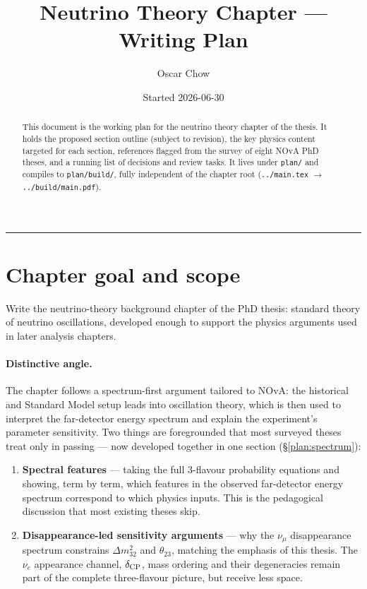 \documentclass[11pt]{article}
\title{Neutrino Theory Chapter — Writing Plan}
\author{Oscar Chow}
\date{Started 2026-06-30}
\begin{document}
\maketitle

\begin{abstract}
\noindent This document is the working plan for the neutrino theory chapter of the thesis. It
holds the proposed section outline (subject to revision), the key physics content targeted for
each section, references flagged from the survey of eight NOvA PhD theses, and a running list of
decisions and review tasks. It lives under \texttt{plan/} and compiles to \texttt{plan/build/}, fully
independent of the chapter root (\texttt{../main.tex} $\to$ \texttt{../build/main.pdf}).
\end{abstract}

\tableofcontents
\vspace{1em}
\hrule
\vspace{1em}

\section{Chapter goal and scope}

Write the neutrino-theory background chapter of the PhD thesis: standard theory of neutrino
oscillations, developed enough to support the physics arguments used in later analysis chapters.

\paragraph{Distinctive angle.} The chapter follows a spectrum-first argument tailored to NOvA:
the historical and Standard Model setup leads into oscillation theory, which is then used to
interpret the far-detector energy spectrum and explain the experiment's parameter sensitivity. Two
things are foregrounded that most surveyed theses treat only in passing --- now developed together
in one section (\S\ref{plan:spectrum}):
\begin{enumerate}
    \item \textbf{Spectral features} --- taking the full 3-flavour probability equations and
    showing, term by term, which features in the observed far-detector energy spectrum correspond
    to which physics inputs. This is the pedagogical discussion that most existing theses skip.
    \item \textbf{Disappearance-led sensitivity arguments} --- why the $\nu_\mu$ disappearance
    spectrum constrains $\Delta m^{2}_{32}$ and $\theta_{23}$, matching the emphasis of this
    thesis. The $\nu_e$ appearance channel, $\delta_{\rm CP}$, mass ordering and their degeneracies
    remain part of the complete three-flavour picture, but receive less space.
\end{enumerate}
\end{document}
